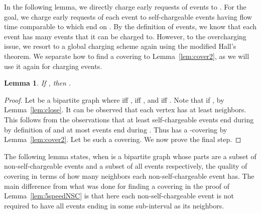 \documentclass[11pt]{article}
\newtheorem{lemma}{Lemma}[section]
\begin{document}
\begin{titlepage}
\iffalse In this section, we show how all the events ending during  can be used to pay for
. To do this, non-self-chargeable events in  are partitioned into two disjoint sets  and
. For simplicity, event  is said to have  if  ends during .
Non-self-chargeable event  is said to be  and in  if it has at least 
self-chargeable events where  is some constant to be fixed later. The rest of the events in  are in 
and said to be .  The  events can be charged to the optimal solution because it has many self-chargeable
events. For each  event, we will bound  with events which end at . Recall that
Lemma~\ref{lem:close} cannot compare  and , where . Thus we find a
\emph{bridge} events , and compare  with  and  with , thereby
 with . \fi








In the following lemma, we directly charge early requests of  events to . For the goal, we charge early
requests of each  event  to self-chargeable events having flow time comparable to  which end
on . By the definition of  events, we know that each  event  has many
events that it can be charged to. However, to the overcharging issue, we resort to a global charging scheme again using
the modified Hall's theorem. We separate how to find a covering to Lemma~\ref{lem:cover2}, as we will use it again for
charging  events.


\begin{lemma}
\label{lem:type1} If , then .
\end{lemma}
\begin{proof}
  Let  be a bipartite graph where  iff ,  iff , and
   iff .
Note that if ,  by Lemma~\ref{lem:close}.
  It can be observed that each vertex
   has at least  neighbors.
  This follows from the observations that at least  self-chargeable
  events end during  by definition of  and
  at most  events end
  during . Thus
   has a -covering by Lemma~\ref{lem:cover2}. Let
   be such a covering. We now prove the final step.

\end{proof}

The following lemma states, when  is a bipartite graph whose parts are a subset of non-self-chargeable events and a
subset of all events respectively, the quality of covering in terms of how many neighbors each non-self-chargeable
event has. The main difference from what was done for finding a covering in the proof of Lemma~\ref{lem:5speedNSC} is
that here each non-self-chargeable event is not required to have all events ending in some sub-interval as its
neighbors.


\end{titlepage}
\end{document}
